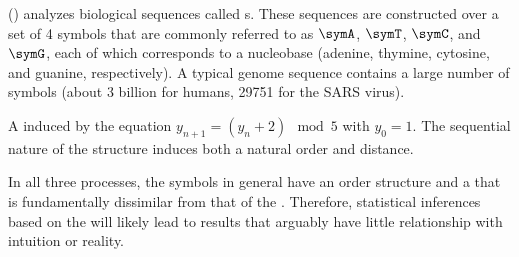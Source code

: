 \begin{minipage}{\tw-50mm}\imarks
   () analyzes biological sequences called s.
        These sequences are constructed over a set of 4 symbols that are commonly referred to as 
        $\symA$, $\symT$, $\symC$, and $\symG$,
        each of which corresponds to a nucleobase (adenine,  thymine, cytosine, and guanine, respectively).\footnotemark
        A typical genome sequence contains a large number of symbols 
        (about 3 billion for humans, 29751 for the SARS virus).\footnotemark
\end{minipage}\hfill{}
\addtocounter{footnote}{-2}

\begin{minipage}{\tw-50mm}\imarks
  A 
  induced by the equation $y_{n+1}=(y_n+2)\mod5$ with $y_0=1$.
  The sequential nature of the structure induces both a natural order and distance.
\end{minipage}\hfill{}

In all three processes, the symbols in general have an order structure and a  %
that is fundamentally dissimilar from that of the . %
Therefore, statistical inferences based on the  will likely lead to results 
that arguably have little relationship with intuition or reality.

